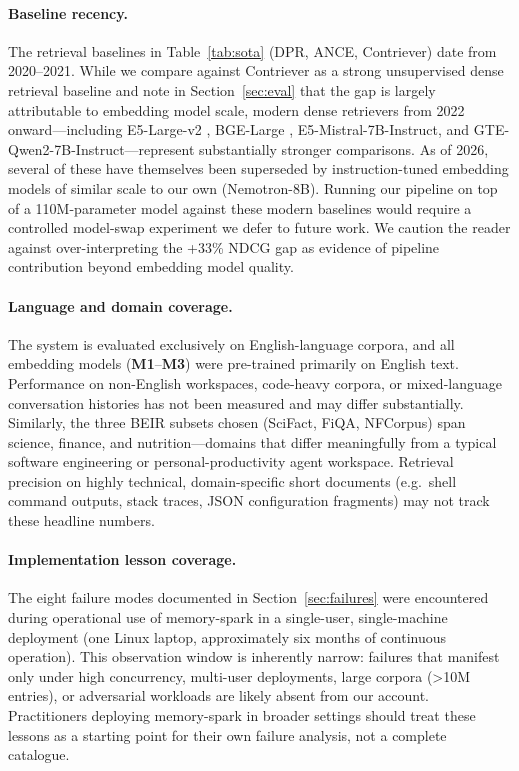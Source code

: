 \documentclass[11pt]{article}
\begin{document}
\paragraph{Baseline recency.}
The retrieval baselines in Table~\ref{tab:sota} (DPR, ANCE, Contriever) date from
2020--2021. While we compare against Contriever as a strong unsupervised dense retrieval
baseline and note in Section~\ref{sec:eval} that the gap is largely attributable to
embedding model scale, modern dense retrievers from 2022 onward---including
E5-Large-v2 \citep{li2023e5}, BGE-Large \citep{chen2024bgem3},
E5-Mistral-7B-Instruct, and GTE-Qwen2-7B-Instruct---represent substantially stronger
comparisons. As of 2026, several of these have themselves been superseded by
instruction-tuned embedding models of similar scale to our own (Nemotron-8B).
Running our pipeline on top of a 110M-parameter model against these modern baselines
would require a controlled model-swap experiment we defer to future work.
We caution the reader against over-interpreting the +33\% NDCG gap as evidence of
pipeline contribution beyond embedding model quality.

\paragraph{Language and domain coverage.}
The system is evaluated exclusively on English-language corpora, and all embedding
models (\textbf{M1}--\textbf{M3}) were pre-trained primarily on English text.
Performance on non-English workspaces, code-heavy corpora, or mixed-language
conversation histories has not been measured and may differ substantially.
Similarly, the three BEIR subsets chosen (SciFact, FiQA, NFCorpus) span science,
finance, and nutrition---domains that differ meaningfully from a typical software
engineering or personal-productivity agent workspace.
Retrieval precision on highly technical, domain-specific short documents (e.g.\
shell command outputs, stack traces, JSON configuration fragments) may not track
these headline numbers.

\paragraph{Implementation lesson coverage.}
The eight failure modes documented in Section~\ref{sec:failures} were encountered during
operational use of memory-spark in a single-user, single-machine deployment (one Linux
laptop, approximately six months of continuous operation).
This observation window is inherently narrow: failures that manifest only under high
concurrency, multi-user deployments, large corpora (>10M entries), or adversarial
workloads are likely absent from our account.
Practitioners deploying memory-spark in broader settings should treat these lessons
as a starting point for their own failure analysis, not a complete catalogue.
\end{document}
